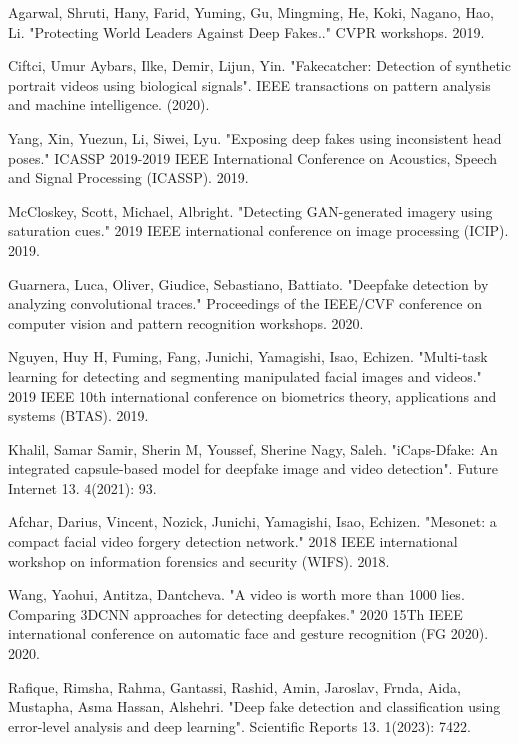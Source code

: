 \documentclass{svproc}
\begin{document}
\begin{thebibliography}{6}
Agarwal, Shruti, Hany, Farid, Yuming, Gu, Mingming, He, Koki, Nagano, Hao, Li. "Protecting World Leaders Against Deep Fakes.." CVPR workshops. 2019.

Ciftci, Umur Aybars, Ilke, Demir, Lijun, Yin. "Fakecatcher: Detection of synthetic portrait videos using biological signals". IEEE transactions on pattern analysis and machine intelligence. (2020).

Yang, Xin, Yuezun, Li, Siwei, Lyu. "Exposing deep fakes using inconsistent head poses." ICASSP 2019-2019 IEEE International Conference on Acoustics, Speech and Signal Processing (ICASSP). 2019.

McCloskey, Scott, Michael, Albright. "Detecting GAN-generated imagery using saturation cues." 2019 IEEE international conference on image processing (ICIP). 2019.

Guarnera, Luca, Oliver, Giudice, Sebastiano, Battiato. "Deepfake detection by analyzing convolutional traces." Proceedings of the IEEE/CVF conference on computer vision and pattern recognition workshops. 2020.

Nguyen, Huy H, Fuming, Fang, Junichi, Yamagishi, Isao, Echizen. "Multi-task learning for detecting and segmenting manipulated facial images and videos." 2019 IEEE 10th international conference on biometrics theory, applications and systems (BTAS). 2019.

Khalil, Samar Samir, Sherin M, Youssef, Sherine Nagy, Saleh. "iCaps-Dfake: An integrated capsule-based model for deepfake image and video detection". Future Internet 13. 4(2021): 93.

Afchar, Darius, Vincent, Nozick, Junichi, Yamagishi, Isao, Echizen. "Mesonet: a compact facial video forgery detection network." 2018 IEEE international workshop on information forensics and security (WIFS). 2018.

Wang, Yaohui, Antitza, Dantcheva. "A video is worth more than 1000 lies. Comparing 3DCNN approaches for detecting deepfakes." 2020 15Th IEEE international conference on automatic face and gesture recognition (FG 2020). 2020.

Rafique, Rimsha, Rahma, Gantassi, Rashid, Amin, Jaroslav, Frnda, Aida, Mustapha, Asma Hassan, Alshehri. "Deep fake detection and classification using error-level analysis and deep learning". Scientific Reports 13. 1(2023): 7422.


\end{thebibliography}
\end{document}
